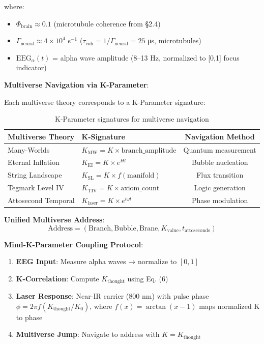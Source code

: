 \documentclass[12pt]{article}
\begin{document}
where:
\begin{itemize}
\item $\Phi_{\text{brain}} \approx 0.1$ (microtubule coherence from §2.4)
\item $\Gamma_{\text{neural}} \approx 4 \times 10^{4}$ s$^{-1}$ ($\tau_{\text{coh}} = 1/\Gamma_{\text{neural}} = 25$ μs, microtubules)
\item $\text{EEG}_{\alpha}(t)$ = alpha wave amplitude (8--13 Hz, normalized to [0,1] focus indicator)
\end{itemize}

\textbf{Multiverse Navigation via K-Parameter}:

Each multiverse theory corresponds to a K-Parameter signature:

\begin{table}[h]
\centering
\begin{tabular}{|l|l|c|}
\hline
\textbf{Multiverse Theory} & \textbf{K-Signature} & \textbf{Navigation Method} \\
\hline
Many-Worlds & $K_{\text{MW}} = K \times \text{branch\_amplitude}$ & Quantum measurement \\
Eternal Inflation & $K_{\text{EI}} = K \times e^{Ht}$ & Bubble nucleation \\
String Landscape & $K_{\text{SL}} = K \times f(\text{manifold})$ & Flux transition \\
Tegmark Level IV & $K_{\text{TIV}} = K \times \text{axiom\_count}$ & Logic generation \\
Attosecond Temporal & $K_{\text{laser}} = K \times e^{i\omega t}$ & Phase modulation \\
\hline
\end{tabular}
\caption{K-Parameter signatures for multiverse navigation}
\end{table}

\textbf{Unified Multiverse Address}:
\begin{equation}
\text{Address} = (\text{Branch}, \text{Bubble}, \text{Brane}, K_{\text{value}}, t_{\text{attoseconds}})
\end{equation}

\textbf{Mind-K-Parameter Coupling Protocol}:
\begin{enumerate}
\item \textbf{EEG Input}: Measure alpha waves → normalize to $[0,1]$
\item \textbf{K-Correlation}: Compute $K_{\text{thought}}$ using Eq. (6)
\item \textbf{Laser Response}: Near-IR carrier (800 nm) with pulse phase $\phi = 2\pi f(K_{\text{thought}}/K_0)$, where $f(x) = \arctan(x-1)$ maps normalized K to phase
\item \textbf{Multiverse Jump}: Navigate to address with $K = K_{\text{thought}}$
\end{enumerate}
\end{document}
